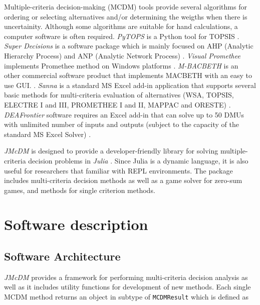 \documentclass[preprint,review, 12pt, a4paper]{elsarticle}
\begin{document}
Multiple-criteria decision-making (MCDM) tools provide several algorithms for ordering or  selecting alternatives and/or determining the weigths when there is uncertainity. Although some algorithms are suitable for hand calculations, a computer software is often required. \emph{PyTOPS} is a Python tool for TOPSIS \cite{PyTOPS}. \emph{Super Decisions} is a software package which is mainly focused on AHP (Analytic Hierarchy Process) and ANP (Analytic Network Process) \cite{superdecision}. \emph{Visual Promethee} implements Promethee method on Windows platforms \cite{visualpromethee}. \emph{M-BACBETH} is an other commercial software product that implements MACBETH with an easy to use GUI.  \cite{macbeth}. \emph{Sanna} is a standard MS Excel add-in application that supports several basic methods for multi-criteria evaluation of alternatives (WSA, TOPSIS, ELECTRE I and III, PROMETHEE I and II, MAPPAC and ORESTE) \cite{sanna}. \emph{DEAFrontier} software requires an Excel add-in that can solve up to 50 DMUs with unlimited number of inputs and outputs (subject to the capacity of the standard MS Excel Solver) \cite{deafrontier}.

\emph{JMcDM} is designed to provide a developer-friendly library for solving multiple-criteria decision problems in \emph{Julia} \cite{julia}. Since Julia is a dynamic language, it is also useful for researchers that familiar with REPL environments. The package includes multi-criteria decision methods as well as a game solver for zero-sum games, and methods for single criterion methods. 

\section{Software description}
\label{sec:software_description}



\subsection{Software Architecture}
\label{section:softwareArch}

\emph{JMcDM} provides a framework for performing multi-criteria decision analysis as well as it includes utility functions for development of new methods. Each single MCDM method returns an object in subtype of \texttt{MCDMResult} which is defined as 
\end{document}
